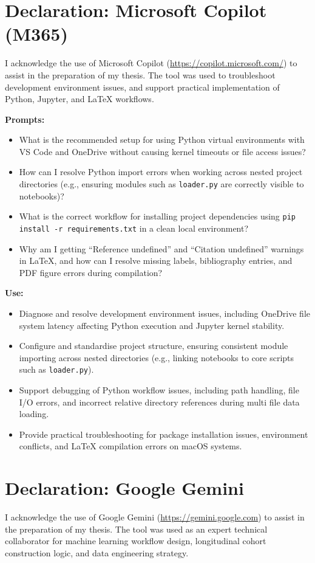 \section*{Declaration: Microsoft Copilot (M365)}
I acknowledge the use of Microsoft Copilot (\url{https://copilot.microsoft.com/}) to assist in the preparation of my thesis. The tool was used to troubleshoot development environment issues, and support practical implementation of Python, Jupyter, and LaTeX workflows.

\textbf{Prompts:}
\begin{itemize}
    \item[-] What is the recommended setup for using Python virtual environments with VS Code and OneDrive without causing kernel timeouts or file access issues?
    \item[-] How can I resolve Python import errors when working across nested project directories (e.g., ensuring modules such as \texttt{loader.py} are correctly visible to notebooks)?
    \item[-] What is the correct workflow for installing project dependencies using \texttt{pip install -r requirements.txt} in a clean local environment?
    \item[-] Why am I getting ``Reference undefined'' and ``Citation undefined'' warnings in LaTeX, and how can I resolve missing labels, bibliography entries, and PDF figure errors during compilation?
\end{itemize}

\textbf{Use:}
\begin{itemize}
    \item[-] Diagnose and resolve development environment issues, including OneDrive file system latency affecting Python execution and Jupyter kernel stability.
    \item[-] Configure and standardise project structure, ensuring consistent module importing across nested directories (e.g., linking notebooks to core scripts such as \texttt{loader.py}).
    \item[-] Support debugging of Python workflow issues, including path handling, file I/O errors, and incorrect relative directory references during multi file data loading.
    \item[-] Provide practical troubleshooting for package installation issues, environment conflicts, and LaTeX compilation errors on macOS systems.
\end{itemize}

\section*{Declaration: Google Gemini}
I acknowledge the use of Google Gemini (\url{https://gemini.google.com}) to assist in the preparation of my thesis. The tool was used as an expert technical collaborator for machine learning workflow design, longitudinal cohort construction logic, and data engineering strategy.

